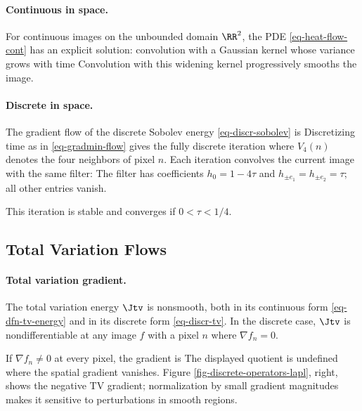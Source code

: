   
\paragraph{Continuous in space.}

For continuous images on the unbounded domain $\RR^2$, the PDE \eqref{eq-heat-flow-cont} has an explicit solution: convolution with a Gaussian kernel whose variance grows with time
Convolution with this widening kernel progressively smooths the image.

  
\paragraph{Discrete in space.}

The gradient flow of the discrete Sobolev energy \eqref{eq-discr-sobolev} is
Discretizing time as in \eqref{eq-gradmin-flow} gives the fully discrete iteration
where $V_4(n)$ denotes the four neighbors of pixel $n$. Each iteration convolves the current image with the same filter:
The filter has coefficients $h_0=1-4\tau$ and $h_{\pm e_1}=h_{\pm e_2}=\tau$; all other entries vanish.

This iteration is stable and converges if $0<\tau<1/4$.



                                                                      
\subsection{Total Variation Flows}

  
\paragraph{Total variation gradient.}

The total variation energy $\Jtv$ is nonsmooth, both in its continuous form \eqref{eq-dfn-tv-energy} and in its discrete form \eqref{eq-discr-tv}. In the discrete case, $\Jtv$ is nondifferentiable at any image $f$ with a pixel $n$ where $\nabla f_n = 0$.

If $\nabla f_n\neq0$ at every pixel, the gradient is
The displayed quotient is undefined where the spatial gradient vanishes. Figure \ref{fig-discrete-operators-lapl}, right, shows the negative TV gradient; normalization by small gradient magnitudes makes it sensitive to perturbations in smooth regions.

